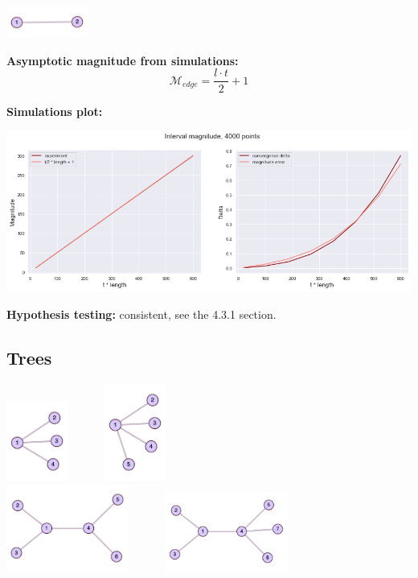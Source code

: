 \documentclass{article}
\begin{document}
\begin{center}
    \includegraphics[width=0.2\textwidth]{interval_exp}
\end{center}

\textbf{Asymptotic magnitude from simulations:}
$$\mathcal{M}_{edge} = \frac{l \cdot t}{2} + 1$$

\textbf{Simulations plot:}

\begin{center}
    \includegraphics[width=\textwidth]{interval_plot}
\end{center}


\textbf{Hypothesis testing:}  consistent, see the 4.3.1 section. 

\subsection{Trees}

\begin{center}
    \includegraphics[width=0.15\textwidth]{bundle1_exp} \ \ \ \ \ \  
    \includegraphics[width=0.15\textwidth]{bundle2_exp} \\
    \includegraphics[width=0.3\textwidth]{comb_bundle1} \ \ \ \ \ \ 
    \includegraphics[width=0.3\textwidth]{comb_bundle2}
\end{center}
\end{document}
